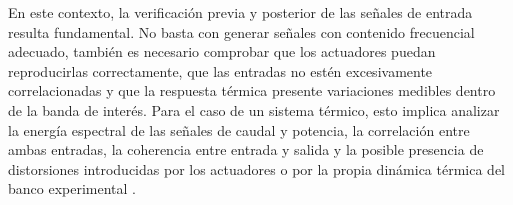 \documentclass[11pt]{report}
\begin{document}
En este contexto, la verificación previa y posterior de las señales de entrada resulta fundamental. No basta con generar señales con contenido frecuencial adecuado, también es necesario comprobar que los actuadores puedan reproducirlas correctamente, que las entradas no estén excesivamente correlacionadas y que la respuesta térmica presente variaciones medibles dentro de la banda de interés. Para el caso de un sistema térmico, esto implica analizar la energía espectral de las señales de caudal y potencia, la correlación entre ambas entradas, la coherencia entre entrada y salida y la posible presencia de distorsiones introducidas por los actuadores o por la propia dinámica térmica del banco experimental \cite{ljung1999system}.


\end{document}
